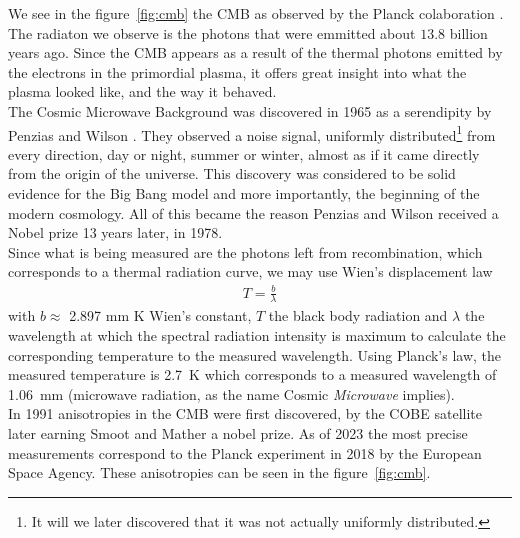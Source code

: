 We see in the figure~\ref{fig:cmb} the CMB as observed by the Planck colaboration \cite{Planck2018}. The radiaton we observe is the photons that were emmitted about $13.8$ billion years ago. Since the CMB appears as a result of the thermal photons emitted by the electrons in the primordial plasma, it offers great insight into what the plasma looked like, and the way it behaved.  \\

The Cosmic Microwave Background was discovered in 1965 as a serendipity by Penzias and Wilson \cite{Penzias1965}. They observed a noise signal, uniformly distributed\footnote{It will we later discovered that it was not actually uniformly distributed.} from every direction, day or night, summer or winter, almost as if it came directly from the origin of the universe.
This discovery was considered to be solid evidence for the Big Bang model and more importantly, the beginning of the modern cosmology. All of this became the reason Penzias and Wilson received a Nobel prize 13 years later, in 1978. \\

Since what is being measured are the photons left from recombination, which corresponds to a thermal radiation curve, we may use Wien's displacement law  \\
\begin{align}
	T = \frac{b}{\lambda}
	\label{eq:wien-displacement}
\end{align}
with $b\approx $ 2.897 mm K Wien's constant, $T$ the black body radiation and $\lambda$ the wavelength at which the spectral radiation intensity is maximum to calculate the corresponding temperature to the measured wavelength. Using Planck's law, the measured temperature is \SI{2.7}{K} which corresponds to a measured wavelength of \SI{1.06}{mm} (microwave radiation, as the name Cosmic \textit{Microwave} implies). \\

In 1991 anisotropies in the CMB were first discovered, by the COBE satellite\cite{SmootMather} later earning Smoot and Mather a nobel prize. As of 2023 the most precise measurements correspond to the Planck experiment in 2018 \cite{Planck2018} by the European Space Agency. These anisotropies can be seen in the figure~\ref{fig:cmb}. \\

